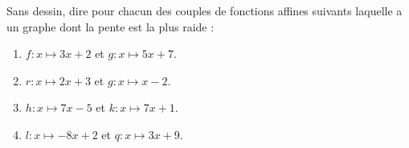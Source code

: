 
\begin{exercice}\label{exosmath-0490}

    Sans dessin, dire pour chacun des couples de fonctions affines suivants laquelle a un graphe dont la pente est la plus raide :
    \begin{enumerate}
        \item
            \( f\colon x\mapsto 3x+2\) et \( g\colon x\mapsto 5x+7\).
        \item
            \( r\colon x\mapsto 2x+3\) et \( g\colon x\mapsto x-2\).
        \item
            \( h\colon x\mapsto 7x-5\) et \( k\colon x\mapsto 7x+1\).
        \item
            \( l\colon x\mapsto -8x+2\) et \( q\colon x\mapsto 3x+9\).
    \end{enumerate}

\end{exercice}
